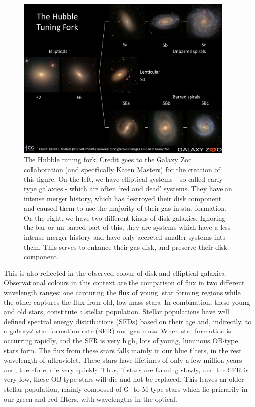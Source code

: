 \begin{figure}
\centering
\includegraphics[width=0.95\textwidth]{Introduction/figures/hubble-tuning-fork.jpg}
\caption[The Hubble tuning fork.]{The Hubble tuning fork. Credit goes to the Galaxy Zoo collaboration (and specifically Karen Masters) for the creation of this figure. On the left, we have elliptical systems - so called early-type galaxies - which are often `red and dead' systems. They have an intense merger history, which has destroyed their disk component and caused them to use the majority of their gas in star formation. On the right, we have two different kinds of disk galaxies. Ignoring the bar or un-barred part of this, they are systems which have a less intense merger history and have only accreted smaller systems into them. This serves to enhance their gas disk, and preserve their disk component.}
\label{fig:hubble-tuning}
\end{figure}

This is also reflected in the observed colour of disk and elliptical galaxies. Observational colours in this context are the comparison of flux in two different wavelength ranges: one capturing the flux of young, star forming regions while the other captures the flux from old, low mass stars. In combination, these young and old stars, constitute a stellar population. Stellar populations have well defined spectral energy distributions (SEDs) based on their age and, indirectly, to a galaxys' star formation rate (SFR) and gas mass. When star formation is occurring rapidly, and the SFR is very high, lots of young, luminous OB-type stars form. The flux from these stars falls mainly in our blue filters, in the rest wavelength of ultraviolet. These stars have lifetimes of only a few million years and, therefore, die very quickly. Thus, if stars are forming slowly, and the SFR is very low, these OB-type stars will die and not be replaced. This leaves an older stellar population, mainly composed of G- to M-type stars which lie primarily in our green and red filters, with wavelengths in the optical. 


